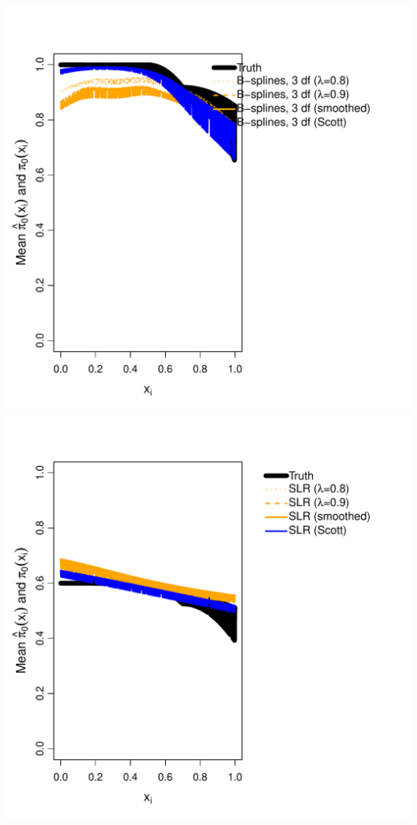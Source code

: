 \documentclass{article}\usepackage[]{graphicx}\usepackage[]{color}
\makeatletter
\def\maxwidth{ %
  \ifdim\Gin@nat@width>\linewidth
    \linewidth
  \else
    \Gin@nat@width
  \fi
}
\newenvironment{knitrout}{}{} %
\makeatother
\begin{document}
\begin{knitrout}
{\includegraphics[width=\maxwidth]{Figures/unnamed-chunk-1-5} 
\includegraphics[width=\maxwidth]{Figures/unnamed-chunk-1-6} 
}
\end{knitrout}
\end{document}
